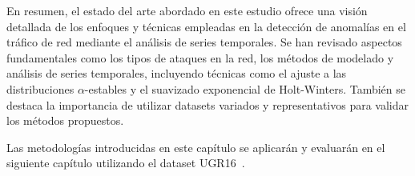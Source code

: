 En resumen, el estado del arte abordado en este estudio ofrece una visión detallada de los enfoques y técnicas empleadas en la detección de anomalías en el tráfico de red mediante el análisis de series temporales. Se han revisado aspectos fundamentales como los tipos de ataques en la red, los métodos de modelado y análisis de series temporales, incluyendo técnicas como el ajuste a las distribuciones $\alpha$-estables y el suavizado exponencial de Holt-Winters. También se destaca la importancia de utilizar datasets variados y representativos para validar los métodos propuestos.

Las metodologías introducidas en este capítulo se aplicarán y evaluarán en el siguiente capítulo utilizando el dataset UGR16~\cite{datosugr16}.